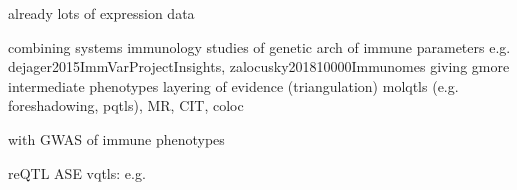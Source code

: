 \begin{outline}
    already lots of expression data

    combining systems immunology studies of genetic arch of immune parameters
            e.g. dejager2015ImmVarProjectInsights, zalocusky201810000Immunomes
        giving gmore intermediate phenotypes
        layering of evidence (triangulation)
            molqtls (e.g. foreshadowing, pqtls), MR, CIT, coloc

    with GWAS of immune phenotypes

    reQTL
    ASE
    vqtls: e.g. %

\end{outline}

